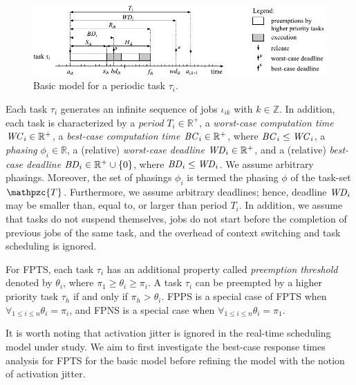 \documentclass[conference,compsoc]{IEEEtran}
\newcommand{\bc}    {\mbox{\it BC}}
\newcommand{\bd}    {\mbox{\it BD}}
\newcommand{\wc}    {\mbox{\it WC}}
\newcommand{\wcd}   {\mbox{\it WD}}
\begin{document}
\begin{figure}
	\centering
	\includegraphics[width=1\linewidth]{fig/task_model_2}
	\caption{Basic model for a periodic task $\tau_i$.}
	\label{fig:taskmodel}
\end{figure}

Each task $\tau_i$ generates an infinite sequence of jobs $\iota_{ik}$ with $k\in \mathbb{Z}$. In addition, each task is characterized by a \textit{period} $T_i \in \mathbb{R^{+}}$, a \textit{worst-case computation time} $\wc_i \in \mathbb{R^{+}}$, a \textit{best-case computation time} $\bc_i \in \mathbb{R^{+}}$, where $\bc_i \leq \wc_i$, a \textit{phasing} $\phi_i \in \mathbb{R}$, a (relative) \textit{worst-case deadline} $\wcd_i \in \mathbb{R^{+}}$, and a (relative) \textit{best-case deadline} $\bd_i \in \mathbb{R^{+}}\cup \{0\}$, where $\bd_i \leq \wcd_i$. We assume arbitrary phasings. Moreover, the set of phasings $\phi_i$ is termed the phasing $\phi$ of the task-set $\mathpzc{T}$. Furthermore, we assume arbitrary deadlines; hence, deadline $\wcd_i$ may be smaller than, equal to, or larger than period $T_i$. In addition, we assume that tasks do not suspend themselves, jobs do not start before the completion of previous jobs of the same task, and the overhead of context switching and task scheduling is ignored.

For FPTS, each task $\tau_i$ has an additional property called \textit{preemption threshold} denoted by $\theta_i$, where $\pi_1 \geq \theta_i \geq \pi_i$. A task $\tau_i$ can be preempted by a higher priority task $\tau_h$ if and only if $\pi_h > \theta_i$. FPPS is a special case of FPTS when $\forall_{1\leq i \leq n}\theta_i = \pi_i$, and FPNS is a special case when $\forall_{1\leq i \leq n}\theta_i = \pi_1$.

It is worth noting that activation jitter is ignored in the real-time scheduling model under study. We aim to first investigate the best-case response times analysis for FPTS for the basic model before refining the model with the notion of activation jitter.
\end{document}
